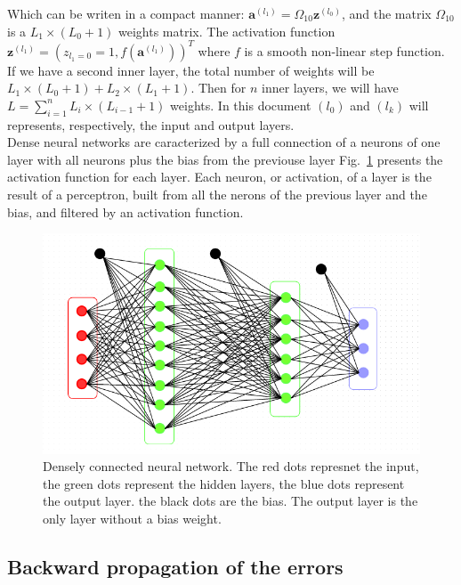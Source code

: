 \documentclass[final, paper=letter,5p,times,twocolumn]{elsarticle}
\begin{document}
Which can be writen in a compact manner: $\bm{a}^{(l_{1})} = \Omega_{10}\bm{z}^{(l_{0})}$, and the matrix $\Omega_{10}$ is a $L_{1}\times(L_{0}+1)$ weights matrix. The activation function $\bm{z}^{(l_{1})} = (z_{l_{1} = 0} = 1, f(\bm{a}^{(l_{1})}))^{T}$ where $f$ is a smooth non-linear step function. If we have a second inner layer, the total number of weights will be $L_{1}\times(L_{0}+1) + L_{2}\times(L_{1}+1)$. Then for $n$ inner layers, we will have $L = \sum_{i = 1}^{n}L_{i}\times(L_{i-1}+1)$ weights. In this document $(l_{0})$ and $(l_{k})$ will represents, respectively, the input and output layers.\\
Dense neural networks are caracterized by a full connection of a neurons of one layer with all neurons plus the bias from the previouse layer Fig.~\ref{fig:Densely_connected_neural_network} presents the activation function for each layer. Each neuron, or activation, of a layer is the result of a perceptron, built from all the nerons of the previous layer and the bias, and filtered by an activation function. 


\begin{figure}[htbp]
   \begin{center}
      \includegraphics[scale=0.3, angle=0]{images/densely_connected_nn.png}
   \end{center}
   \caption{Densely connected neural network. The red dots represnet the input, the green dots represent the hidden layers, the blue dots represent the output layer. the black dots are the bias. The output layer is the only layer without a bias weight.}
  \label{fig:Densely_connected_neural_network} 
\end{figure}


\subsection{Backward propagation of the errors}
\end{document}
